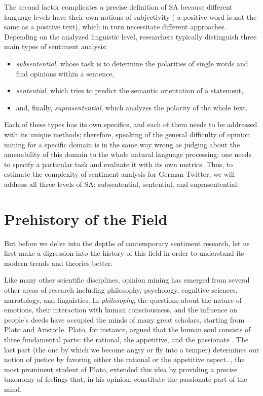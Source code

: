 The second factor complicates a precise definition of SA because
different language levels have their own notions of subjectivity
(\eg{} a positive word is not the same as a positive text), which in
turn necessitate different approaches.  Depending on the analyzed
linguistic level, researchers typically distinguish three main types
of sentiment analysis:
\begin{itemize}
  \item\emph{subsentential}, whose task is to determine the polarities
    of single words and find opinions within a sentence,
  \item\emph{sentential}, which tries to predict the semantic
    orientation of a statement,
  \item and, finally, \emph{suprasentential}, which analyzes the
    polarity of the whole text.
\end{itemize}
Each of these types has its own specifics, and each of them needs to
be addressed with its unique methods; therefore, speaking of the
general difficulty of opinion mining for a specific domain is in the
same way wrong as judging about the amenability of this domain to the
whole natural language processing: one needs to specify a particular
task and evaluate it with its own metrics.  Thus, to estimate the
complexity of sentiment analysis for German Twitter, we will address
all three levels of SA: subsentential, sentential, and
suprasentential.

\section{Prehistory of the Field}

But before we delve into the depths of contemporary sentiment
research, let us first make a digression into the history of this
field in order to understand its modern trends and theories better.

Like many other scientific disciplines, opinion mining has emerged
from several other areas of research including philosophy, psychology,
cognitive sciences, narratology, and linguistics.  In
\emph{philosophy}, the questions about the nature of emotions, their
interaction with human consciousness, and the influence on people's
deeds have occupied the minds of many great scholars, starting from
Plato and Aristotle.  Plato, for instance, argued that the human soul
consists of three fundamental parts: the rational, the appetitive, and
the passionate \citep[see][Book~IV]{Plato:91}.  The last part (the one
by which we become angry or fly into a temper) determines our notion
of justice by favoring either the rational or the appetitive aspect.
\citet{Aristotle:54}, the most prominent student of Plato, extended
this idea by providing a precise taxonomy of feelings that, in his
opinion, constitute the passionate part of the mind.


